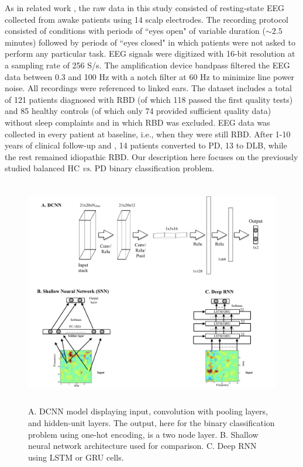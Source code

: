 \documentclass[review]{elsarticle}
\begin{document}
As in related work \citep{Brazete:2016aa,Ruffini:2016ad,Ruffini:2017ac}, the raw data in this study consisted of resting-state EEG collected from awake patients using 14 scalp electrodes. The recording protocol consisted of conditions with periods of ``eyes open" of variable duration ($\sim 2.5$ minutes) followed by periods of ``eyes closed" in which patients were not asked to perform any particular task. EEG signals were digitized with 16-bit resolution at a sampling rate of 256 S/s. The amplification device bandpass filtered the EEG data between 0.3 and 100 Hz with a notch filter at 60 Hz to minimize line power noise. All recordings were referenced to linked ears.
The dataset includes a total of 121 patients diagnosed with RBD (of which 118 passed the first quality tests) and 85 healthy controls (of which only 74 provided sufficient quality data) without sleep complaints and in which RBD was excluded. EEG data was collected in every patient at baseline, i.e., when they were still RBD. After 1-10 years of clinical follow-up and , 14 patients converted to PD, 13 to DLB, while the rest remained idiopathic RBD. 
Our description here focuses on the previously studied balanced HC {\em vs.} PD binary classification problem. %

\begin{figure}
	\centering
	\includegraphics[height=10cm]{figures/SpectNet}
	\caption{A. DCNN model displaying input, convolution with pooling layers, and hidden-unit layers. The output, here for the binary classification problem using one-hot encoding, is a two node layer. B. Shallow neural network architecture used for comparison. C. Deep RNN using LSTM or GRU cells.}
	\label{fig:arch}
\end{figure}
\end{document}
